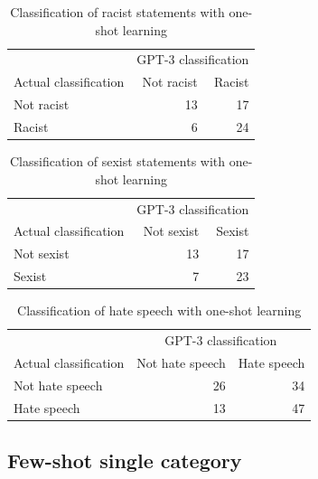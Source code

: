 \documentclass[12pt,]{article}
\begin{document}
\begin{table}[!h]

\caption{\label{tab:oneshot-racism}Classification of racist statements with one-shot learning}
\centering
\fontsize{8}{10}\selectfont
\begin{tabular}[t]{lrr}
\toprule
\multicolumn{1}{c}{ } & \multicolumn{2}{c}{GPT-3 classification} \\
\cmidrule(l{3pt}r{3pt}){2-3}
Actual classification & Not racist & Racist\\
\midrule
Not racist & 13 & 17\\
Racist & 6 & 24\\
\bottomrule
\end{tabular}
\end{table}

\begin{table}[!h]

\caption{\label{tab:oneshot-sexism}Classification of sexist statements with one-shot learning}
\centering
\fontsize{8}{10}\selectfont
\begin{tabular}[t]{lrr}
\toprule
\multicolumn{1}{c}{ } & \multicolumn{2}{c}{GPT-3 classification} \\
\cmidrule(l{3pt}r{3pt}){2-3}
Actual classification & Not sexist & Sexist\\
\midrule
Not sexist & 13 & 17\\
Sexist & 7 & 23\\
\bottomrule
\end{tabular}
\end{table}

\begin{table}[!h]

\caption{\label{tab:oneshot-hate}Classification of hate speech with one-shot learning}
\centering
\fontsize{8}{10}\selectfont
\begin{tabular}[t]{lrr}
\toprule
\multicolumn{1}{c}{ } & \multicolumn{2}{c}{GPT-3 classification} \\
\cmidrule(l{3pt}r{3pt}){2-3}
Actual classification & Not hate speech & Hate speech\\
\midrule
Not hate speech & 26 & 34\\
Hate speech & 13 & 47\\
\bottomrule
\end{tabular}
\end{table}

\newpage

\hypertarget{appendixbfewshotsingle}{%
\subsection{Few-shot single category}\label{appendixbfewshotsingle}}
\end{document}
